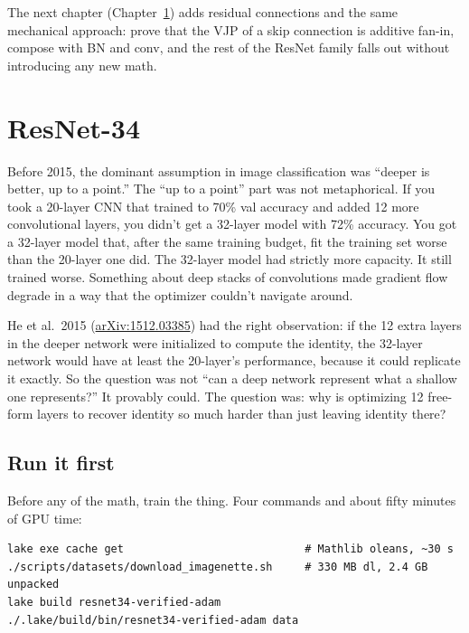 The next chapter (Chapter~\ref{chap:residual}) adds residual connections
and the same mechanical approach: prove that the VJP of a skip
connection is additive fan-in, compose with BN and conv, and the
rest of the ResNet family falls out without introducing any new
math.

\chapter{ResNet-34}
\label{chap:residual}


Before 2015, the dominant assumption in image classification was
``deeper is better, up to a point.'' The ``up to a point'' part was
not metaphorical. If you took a 20-layer CNN that trained to 70\%
val accuracy and added 12 more convolutional layers, you didn't
get a 32-layer model with 72\% accuracy. You got a 32-layer model
that, after the same training budget, fit the training set
worse than the 20-layer one did. The 32-layer model had strictly
more capacity. It still trained worse. Something about deep stacks
of convolutions made gradient flow degrade in a way that the
optimizer couldn't navigate around.

He et al.\ 2015
(\href{https://arxiv.org/abs/1512.03385}{arXiv:1512.03385}) had the
right observation: if the
12 extra layers in the deeper network were initialized to
compute the identity, the 32-layer network would have at least
the 20-layer's performance, because it could replicate it
exactly. So the question was not ``can a deep network represent
what a shallow one represents?'' It provably could. The question
was: why is optimizing 12 free-form layers to recover identity
so much harder than just leaving identity there?

\section{Run it first}
\label{sec:r34_runit}

Before any of the math, train the thing. Four commands and about fifty
minutes of GPU time:

\begin{verbatim}
lake exe cache get                            # Mathlib oleans, ~30 s
./scripts/datasets/download_imagenette.sh     # 330 MB dl, 2.4 GB unpacked
lake build resnet34-verified-adam
./.lake/build/bin/resnet34-verified-adam data
\end{verbatim}

